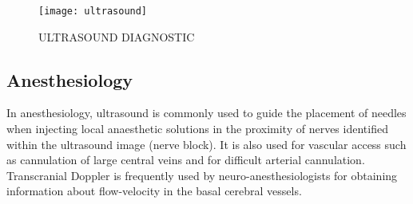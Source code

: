 \documentclass[12pt]{article}
\begin{document}
\begin{figure}[h]
   \centering
   \texttt{[image: ultrasound]}
   \caption{ULTRASOUND DIAGNOSTIC}
   \label{fig_ultrasound}
\end{figure}

\subsection{Anesthesiology}
In anesthesiology, ultrasound is commonly used to guide the placement of needles when injecting local anaesthetic solutions in the proximity of nerves identified within the ultrasound image (nerve block). It is also used for vascular access such as cannulation of large central veins and for difficult arterial cannulation. Transcranial Doppler is frequently used by neuro-anesthesiologists for obtaining information about flow-velocity in the basal cerebral vessels.
\end{document}
